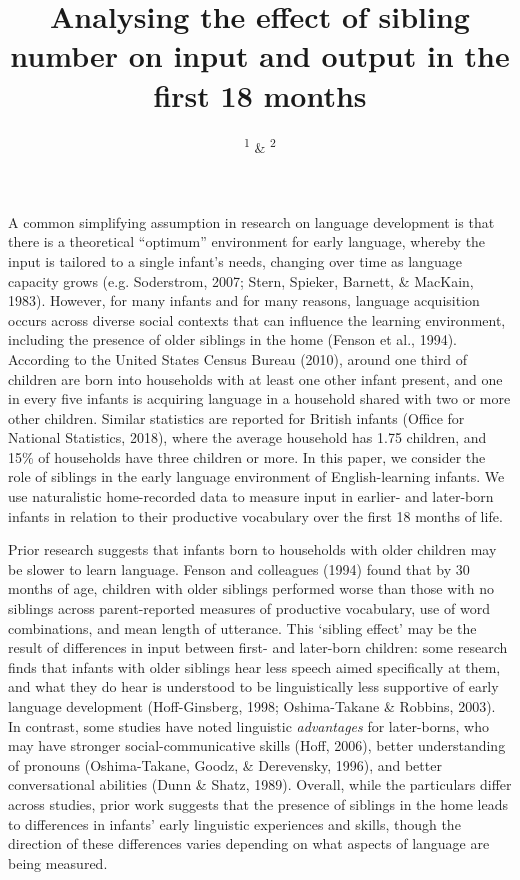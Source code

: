 \documentclass[
  man,mask,floatsintext]{apa6}
\title{Analysing the effect of sibling number on input and output in the first 18 months}
\author{\textsuperscript{1} \& \textsuperscript{2}}
\date{}
\affiliation{\vspace{0.5cm}\textsuperscript{1} \\\textsuperscript{2} }
\begin{document}
\maketitle

A common simplifying assumption in research on language development is that there is a theoretical ``optimum'' environment for early language, whereby the input is tailored to a single infant's needs, changing over time as language capacity grows (e.g. Soderstrom, 2007; Stern, Spieker, Barnett, \& MacKain, 1983). However, for many infants and for many reasons, language acquisition occurs across diverse social contexts that can influence the learning environment, including the presence of older siblings in the home (Fenson et al., 1994). According to the United States Census Bureau (2010), around one third of children are born into households with at least one other infant present, and one in every five infants is acquiring language in a household shared with two or more other children. Similar statistics are reported for British infants (Office for National Statistics, 2018), where the average household has 1.75 children, and 15\% of households have three children or more. In this paper, we consider the role of siblings in the early language environment of English-learning infants. We use naturalistic home-recorded data to measure input in earlier- and later-born infants in relation to their productive vocabulary over the first 18 months of life.

Prior research suggests that infants born to households with older children may be slower to learn language. Fenson and colleagues (1994) found that by 30 months of age, children with older siblings performed worse than those with no siblings across parent-reported measures of productive vocabulary, use of word combinations, and mean length of utterance. This `sibling effect' may be the result of differences in input between first- and later-born children: some research finds that infants with older siblings hear less speech aimed specifically at them, and what they do hear is understood to be linguistically less supportive of early language development (Hoff-Ginsberg, 1998; Oshima-Takane \& Robbins, 2003). In contrast, some studies have noted linguistic \emph{advantages} for later-borns, who may have stronger social-communicative skills (Hoff, 2006), better understanding of pronouns (Oshima-Takane, Goodz, \& Derevensky, 1996), and better conversational abilities (Dunn \& Shatz, 1989). Overall, while the particulars differ across studies, prior work suggests that the presence of siblings in the home leads to differences in infants' early linguistic experiences and skills, though the direction of these differences varies depending on what aspects of language are being measured.
\end{document}
